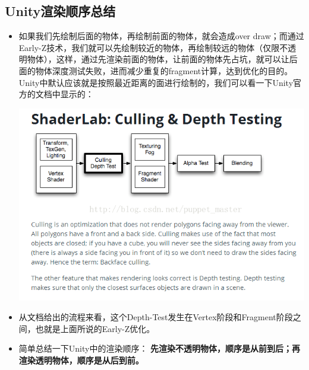 \documentclass[9pt, b5paper]{article}
\begin{document}
\subsection{Unity渲染顺序总结}
\label{sec-2-8}
\begin{itemize}
\item 如果我们先绘制后面的物体，再绘制前面的物体，就会造成over draw；而通过Early-Z技术，我们就可以先绘制较近的物体，再绘制较远的物体（仅限不透明物体），这样，通过先渲染前面的物体，让前面的物体先占坑，就可以让后面的物体深度测试失败，进而减少重复的fragment计算，达到优化的目的。Unity中默认应该就是按照最近距离的面进行绘制的，我们可以看一下Unity官方的文档中显示的：

\includegraphics[width=.9\linewidth]{./pic/renderingOrder.png}
\item 从文档给出的流程来看，这个Depth-Test发生在Vertex阶段和Fragment阶段之间，也就是上面所说的Early-Z优化。
\item 简单总结一下Unity中的渲染顺序： \textbf{先渲染不透明物体，顺序是从前到后；再渲染透明物体，顺序是从后到前。}
\end{itemize}
\end{document}
